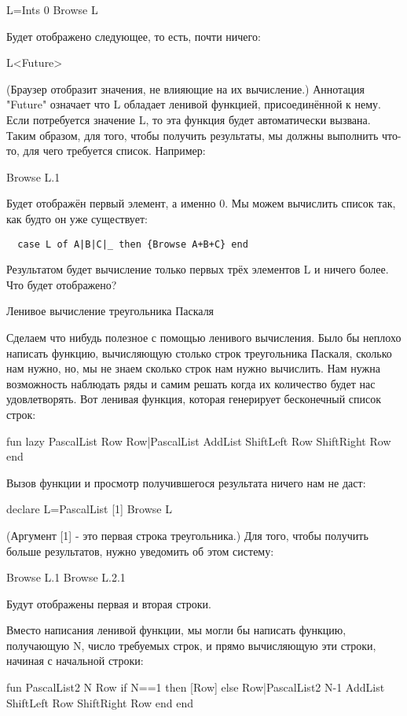 L={Ints 0}
{Browse L}

Будет отображено следующее, то есть, почти ничего:

L<Future>

(Браузер отобразит значения, не влияющие на их вычисление.) Аннотация "Future" означает что L обладает ленивой функцией, присоединённой к нему. Если потребуется значение L, то эта функция будет автоматически вызвана. Таким образом, для того, чтобы получить результаты, мы должны выполнить что-то, для чего требуется список. Например:

{Browse L.1}

Будет отображён первый элемент, а именно 0. Мы можем вычислить список так, как будто он уже существует:

\begin{lstlisting}
  case L of A|B|C|_ then {Browse A+B+C} end
  \end{lstlisting}

Результатом будет вычисление только первых трёх элементов L и ничего более. Что будет отображено?

Ленивое вычисление треугольника Паскаля

Сделаем что нибудь полезное с помощью ленивого вычисления. Было бы неплохо написать функцию, вычисляющую столько строк треугольника Паскаля, сколько нам нужно, но, мы не знаем сколько строк нам нужно вычислить. Нам нужна возможность наблюдать ряды и самим решать когда их количество будет нас удовлетворять. Вот ленивая функция, которая генерирует бесконечный список строк:

fun lazy {PascalList Row}
Row|{PascalList
{AddList {ShiftLeft Row}
{ShiftRight Row}}}
end

Вызов функции и просмотр получившегося результата ничего нам не даст:

declare
L={PascalList [1]}
{Browse L}

(Аргумент [1] - это первая строка треугольника.) Для того, чтобы получить больше результатов, нужно уведомить об этом систему:

{Browse L.1}
{Browse L.2.1}

Будут отображены первая и вторая строки.

Вместо написания ленивой функции, мы могли бы написать функцию, получающую N, число требуемых строк, и прямо вычисляющую эти строки, начиная с начальной строки:

fun {PascalList2 N Row}
if N==1 then [Row]
else
Row|{PascalList2 N-1
{AddList {ShiftLeft Row}
{ShiftRight Row}}}
end
end

